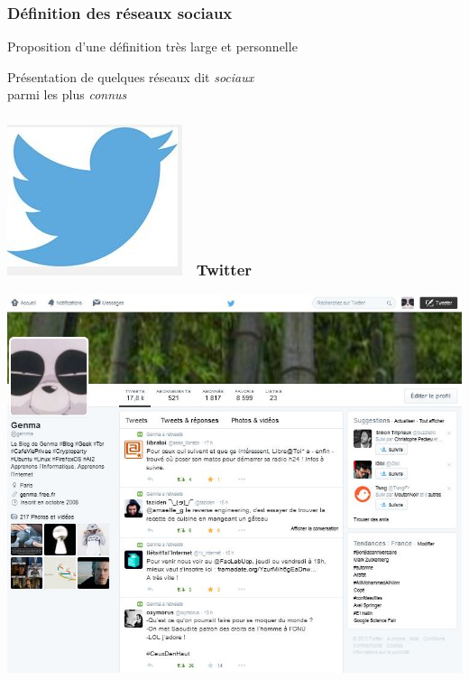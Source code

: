 \documentclass{beamer}
\begin{document}
\begin{frame}
\frametitle{Définition des réseaux sociaux}

\begin{block}{Proposition d'une définition très large et personnelle}
\end{block}
\end{frame}

\begin{frame}
\begin{center}
\Huge{Présentation de quelques réseaux dit \emph{sociaux}\\
parmi les plus \emph{connus}}
\end{center}
\end{frame}

\begin{frame}
\frametitle{\includegraphics[scale=0.2] {./images/twitter_logo.jpg}~ Twitter}
\begin{center}
\includegraphics[scale=0.6] {./images/twitter_capture.jpg} 
\end{center}
\end{frame}
\end{document}
